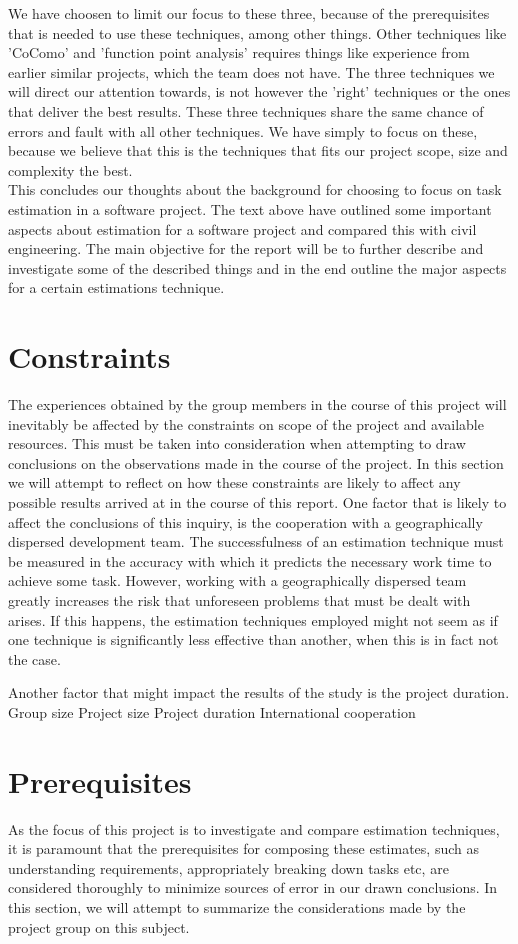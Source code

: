 We have choosen to limit our focus to these three, because of the prerequisites that is needed to use these techniques, among other things. Other techniques like 'CoComo' and 'function point analysis' requires things like experience from earlier similar projects, which the team does not have. The three techniques we will direct our attention towards, is not however the 'right' techniques or the ones that deliver the best results. These three techniques share the same chance of errors and fault with all other techniques. We have simply to focus on these, because we believe that this is the techniques that fits our project scope, size and complexity the best.\\
This concludes our thoughts about the background for choosing to focus on task estimation in a software project. The text above have outlined some important aspects about estimation for a software project and compared this with civil engineering. The main objective for the report will be to further describe and investigate some of the described things and in the end outline the major aspects for a certain estimations technique.

\section{Constraints}
The experiences obtained by the group members in the course of this project will inevitably be affected by the constraints on scope of the project and available resources. This must be taken into consideration when attempting to draw conclusions on the observations made in the course of the project. In this section we will attempt to reflect on how these constraints are likely to affect any possible results arrived at in the course of this report.
One factor that is likely to affect the conclusions of this inquiry, is the cooperation with a geographically dispersed development team. The successfulness of an estimation technique must be measured in the accuracy with which it predicts the necessary work time to achieve some task. However, working with a geographically dispersed team greatly increases the risk that unforeseen problems that must be dealt with arises. If this happens, the estimation techniques employed might not seem as if one technique is significantly less effective than another, when this is in fact not the case.

Another factor that might impact the results of the study is the project duration. 
Group size
Project size
Project duration
International cooperation
\section{Prerequisites}
As the focus of this project is to investigate and compare estimation techniques, it is paramount that the prerequisites for composing these estimates, such as understanding requirements, appropriately breaking down tasks etc, are considered thoroughly to minimize sources of error in our drawn conclusions. In this section, we will attempt to summarize the considerations made by the project group on this subject.


